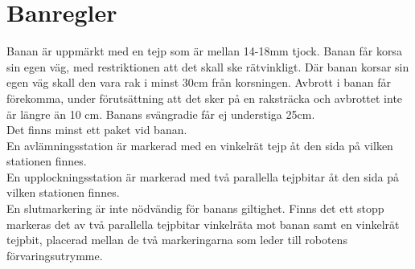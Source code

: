 \section{Banregler} \label{banregler}

Banan är uppmärkt med en tejp som är mellan 14-18mm tjock. Banan får korsa sin egen väg, med restriktionen att det skall ske rätvinkligt. Där banan korsar sin egen väg skall den vara rak i minst 30cm från korsningen. Avbrott i banan får förekomma, under förutsättning att det sker på en raksträcka och avbrottet inte är längre än 10 cm. Banans svängradie får ej understiga 25cm. \\
Det finns minst ett paket vid banan. \\
En avlämningsstation är markerad med en vinkelrät tejp åt den sida på vilken stationen finnes.  \\
En upplockningsstation är markerad med två parallella tejpbitar åt den sida på vilken stationen finnes. \\
En slutmarkering är inte nödvändig för banans giltighet. Finns det ett stopp markeras det av två parallella tejpbitar vinkelräta mot banan samt en vinkelrät tejpbit, placerad mellan de två markeringarna som leder till robotens förvaringsutrymme. \\
